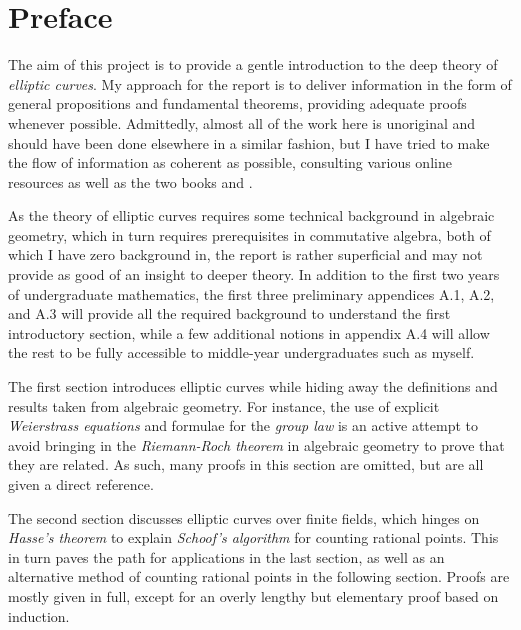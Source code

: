 \documentclass{article}
\theoremstyle{definition}\newtheorem*{definition}{Definition}
\theoremstyle{definition}\newtheorem*{example}{Example}
\theoremstyle{definition}\newtheorem*{remark}{Remark}
\begin{document}
\pagebreak

\tableofcontents

\pagebreak

\section*{Preface}

\par

The aim of this project is to provide a gentle introduction to the deep theory of \emph{elliptic curves}. My approach for the report is to deliver information in the form of general propositions and fundamental theorems, providing adequate proofs whenever possible. Admittedly, almost all of the work here is unoriginal and should have been done elsewhere in a similar fashion, but I have tried to make the flow of information as coherent as possible, consulting various online resources as well as the two books \cite{gtm} and \cite{utm}.

As the theory of elliptic curves requires some technical background in algebraic geometry, which in turn requires prerequisites in commutative algebra, both of which I have zero background in, the report is rather superficial and may not provide as good of an insight to deeper theory. In addition to the first two years of undergraduate mathematics, the first three preliminary appendices A.1, A.2, and A.3 will provide all the required background to understand the first introductory section, while a few additional notions in appendix A.4 will allow the rest to be fully accessible to middle-year undergraduates such as myself.

The first section introduces elliptic curves while hiding away the definitions and results taken from algebraic geometry. For instance, the use of explicit \emph{Weierstrass equations} and formulae for the \emph{group law} is an active attempt to avoid bringing in the \emph{Riemann-Roch theorem} in algebraic geometry to prove that they are related. As such, many proofs in this section are omitted, but are all given a direct reference.

The second section discusses elliptic curves over finite fields, which hinges on \emph{Hasse's theorem} to explain \emph{Schoof's algorithm} for counting rational points. This in turn paves the path for applications in the last section, as well as an alternative method of counting rational points in the following section. Proofs are mostly given in full, except for an overly lengthy but elementary proof based on induction.
\end{document}

